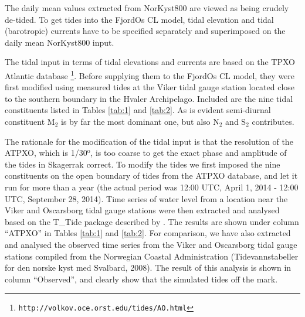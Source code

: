 The daily mean values extracted from NorKyst800 are viewed as being crudely de-tided. To get tides into the FjordOs CL model, tidal elevation and tidal (barotropic) currents have to be specified separately and superimposed on the daily mean NorKyst800 input. 


The tidal input in terms of tidal elevations and currents are based on the TPXO Atlantic database \citep[][hereafter ATPXO]{egber:erofe:2002}\footnote{\texttt{http://volkov.oce.orst.edu/tides/AO.html}}. Before supplying them to the FjordOs CL model, they were first modified using measured tides at the Viker tidal gauge station located close to the southern boundary in the Hvaler Archipelago. Included are the nine tidal constituents listed in Tables \ref{tab:1} and \ref{tab:2}. As is evident semi-diurnal constituent M$_2$ is by far the most dominant one, but also N$_2$ and S$_2$ contributes. 


The rationale for the modification of the tidal input is that the resolution of the ATPXO, which is 1/30$^{\textrm{o}}$, is too coarse to get the exact phase and amplitude of the tides in Skagerrak correct. To modify the tides we first imposed the nine constituents on the open boundary of tides from the ATPXO database, and let it run for more than a year (the actual period was 12:00 UTC, April 1, 2014 - 12:00 UTC, September 28, 2014). Time series of water level from a location near the Viker and Oscarsborg tidal gauge stations were then extracted and analysed based on the T\_Tide package described by \cite{pavlo:etal:2002}. The results are shown under column ``ATPXO'' in Tables \ref{tab:1} and \ref{tab:2}. For comparison, we have also extracted and analysed the observed time series from the Viker and Oscarsborg tidal gauge stations compiled from the Norwegian Coastal Administration (Tidevannstabeller for den norske kyst med Svalbard, 2008). The result of this analysis is shown in column ``Observed'', and clearly show that the simulated tides off the mark.  

